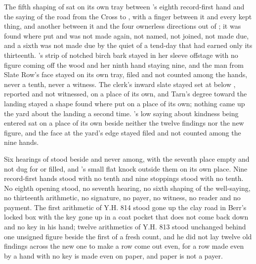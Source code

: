 The fifth shaping of  sat on its own tray between 's eighth record-first hand and the saying of the road from the Cross to , with a finger between it and every kept thing, and another between it and the four ownerless directions out of ; it was found where put and was not made again, not named, not joined, not made due, and a sixth was not made due by the quiet of a tend-day that had earned only its thirteenth. 's strip of notched birch bark stayed in her sleeve offstage with no figure coming off the wood and her ninth hand staying nine, and the man from Slate Row's face stayed on its own tray, filed and not counted among the hands, never a tenth, never a witness. The clerk's inward slate stayed set at  below , reported and not witnessed, on a place of its own, and Tarn's degree toward the landing stayed a shape found where put on a place of its own; nothing came up the yard about the landing a second time. 's low saying about kindness being entered sat on a place of its own beside neither the twelve findings nor the new figure, and the face at the yard's edge stayed filed and not counted among the nine hands.

Six hearings of  stood beside and never among, with the seventh place empty and not dug for or filled, and 's small flat knock outside them on its own place. Nine record-first hands stood with no tenth and nine stoppings stood with no tenth. No eighth opening stood, no seventh hearing, no sixth shaping of the well-saying, no thirteenth arithmetic, no signature, no payer, no witness, no reader and no payment. The first arithmetic of Y.H. 814 stood gone up the clay road in Berr's locked box with the key gone up in a coat pocket that does not come back down and no key in his hand; twelve arithmetics of Y.H. 813 stood unchanged behind one unsigned figure beside the first of a fresh count, and he did not lay twelve old findings across the new one to make a row come out even, for a row made even by a hand with no key is made even on paper, and paper is not a payer.

